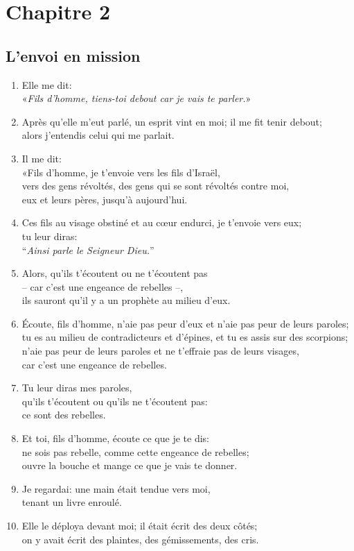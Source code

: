 \noindent
\section*{Chapitre 2}
\subsection*{L'envoi en mission}
\begin{enumerate}[leftmargin=\psleftmargin, labelsep = \pslabelsep, label={\arabic*}, font=\color{\pscolor}\small\textsuperscript, parsep=0em, itemsep=0em, topsep=0em ]
      \item Elle me dit: \\ \decalage «\textit{Fils d’homme, tiens-toi debout car je vais te parler.}»
      \item Après qu’elle m’eut parlé, un esprit vint en moi; il me fit tenir debout; \\ alors j’entendis celui qui me parlait.
      \item Il me dit: \\ «Fils d’homme, je t’envoie vers les fils d’Israël, \\ vers des gens révoltés, des gens qui se sont révoltés contre moi, \\ eux et leurs pères, jusqu’à aujourd’hui.
      \item Ces fils au visage obstiné et au cœur endurci, je t’envoie vers eux; \\ tu leur diras: \\ \decalage “\textit{Ainsi parle le Seigneur Dieu.}”
      \item Alors, qu’ils t’écoutent ou ne t’écoutent pas \\ – car c’est une engeance de rebelles –, \\ ils sauront qu’il y a un prophète au milieu d’eux.\verseSpace
      \item Écoute, fils d’homme, n’aie pas peur d’eux et n’aie pas peur de leurs paroles; \\ tu es au milieu de contradicteurs et d’épines, et tu es assis sur des scorpions; \\ n’aie pas peur de leurs paroles et ne t’effraie pas de leurs visages, \\ car c’est une engeance de rebelles.
      \item Tu leur diras mes paroles, \\ qu’ils t’écoutent ou qu’ils ne t’écoutent pas: \\ ce sont des rebelles. \verseSpace
      \item Et toi, fils d’homme, écoute ce que je te dis: \\ ne sois pas rebelle, comme cette engeance de rebelles; \\ ouvre la bouche et mange ce que je vais te donner.
      \item Je regardai: une main était tendue vers moi, \\ tenant un livre enroulé.
      \item Elle le déploya devant moi; il était écrit des deux côtés; \\ on y avait écrit des plaintes, des gémissements, des cris.
\end{enumerate}
\newpage
